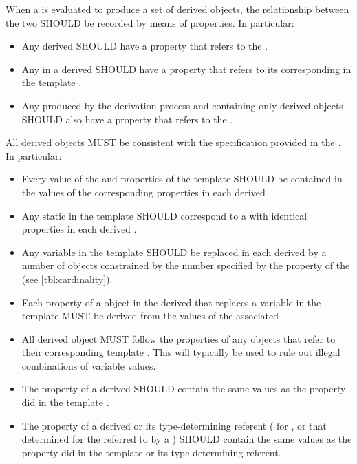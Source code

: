 When a  is evaluated to produce a set of derived  objects, the relationship between the two SHOULD be recorded by means of  properties. 
In particular:
\begin{itemize}
\item Any derived  SHOULD have a  property that refers to the . 
\item Any  in a derived  SHOULD have a  property that refers to its corresponding  in the template .
\item Any  produced by the derivation process and containing only derived  objects SHOULD also have a  property that refers to the .
\end{itemize}

All derived objects MUST be consistent with the specification provided in the .
In particular:
\begin{itemize}
\item Every value of the  and  properties of the template  SHOULD be contained in the values of the corresponding properties in each derived .
\item Any static  in the template  SHOULD correspond to a  with identical properties in each derived .
\item Any variable  in the template  SHOULD be replaced in each derived  by a number of  objects constrained by the number specified by the  property of the  (see \ref{tbl:cardinality}).
\item Each property of a  object in the derived  that replaces a variable  in the template  MUST be derived from the values of the associated . 
\item All derived  object MUST follow the  properties of any  objects that refer to their corresponding template . This will typically be used to rule out illegal combinations of variable values.
\item The  property of a derived  SHOULD contain the same values as the  property did in the template . 
\item The  property of a derived  or its type-determining referent 
( for , or that determined for the  referred to by a )
SHOULD contain the same values as the  property did in the template  or its type-determining referent.
\end{itemize}



